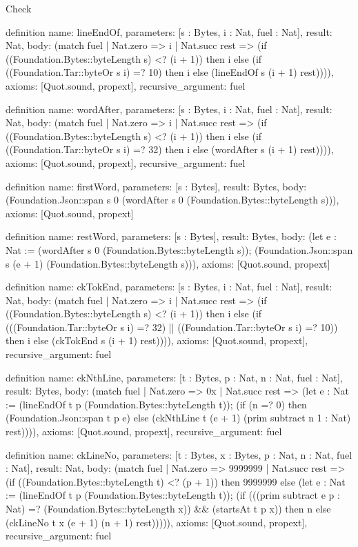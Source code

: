 \begin{lexlean}{Check}
\begin{semanticmodule}
definition{
  name: lineEndOf,
  parameters: [s : Bytes, i : Nat, fuel : Nat],
  result: Nat,
  body: (match fuel
    | Nat.zero => i
    | Nat.succ rest => (if ((Foundation.Bytes::byteLength s) <? (i + 1)) then i else (if ((Foundation.Tar::byteOr s i) =? 10) then i else (lineEndOf s (i + 1) rest)))),
  axioms: [Quot.sound, propext],
  recursive_argument: fuel
}

definition{
  name: wordAfter,
  parameters: [s : Bytes, i : Nat, fuel : Nat],
  result: Nat,
  body: (match fuel
    | Nat.zero => i
    | Nat.succ rest => (if ((Foundation.Bytes::byteLength s) <? (i + 1)) then i else (if ((Foundation.Tar::byteOr s i) =? 32) then i else (wordAfter s (i + 1) rest)))),
  axioms: [Quot.sound, propext],
  recursive_argument: fuel
}

definition{
  name: firstWord,
  parameters: [s : Bytes],
  result: Bytes,
  body: (Foundation.Json::span s 0 (wordAfter s 0 (Foundation.Bytes::byteLength s))),
  axioms: [Quot.sound, propext]
}

definition{
  name: restWord,
  parameters: [s : Bytes],
  result: Bytes,
  body: (let e : Nat := (wordAfter s 0 (Foundation.Bytes::byteLength s)); (Foundation.Json::span s (e + 1) (Foundation.Bytes::byteLength s))),
  axioms: [Quot.sound, propext]
}

definition{
  name: ckTokEnd,
  parameters: [s : Bytes, i : Nat, fuel : Nat],
  result: Nat,
  body: (match fuel
    | Nat.zero => i
    | Nat.succ rest => (if ((Foundation.Bytes::byteLength s) <? (i + 1)) then i else (if (((Foundation.Tar::byteOr s i) =? 32) || ((Foundation.Tar::byteOr s i) =? 10)) then i else (ckTokEnd s (i + 1) rest)))),
  axioms: [Quot.sound, propext],
  recursive_argument: fuel
}

definition{
  name: ckNthLine,
  parameters: [t : Bytes, p : Nat, n : Nat, fuel : Nat],
  result: Bytes,
  body: (match fuel
    | Nat.zero => 0x
    | Nat.succ rest => (let e : Nat := (lineEndOf t p (Foundation.Bytes::byteLength t)); (if (n =? 0) then (Foundation.Json::span t p e) else (ckNthLine t (e + 1) (prim subtract n 1 : Nat) rest)))),
  axioms: [Quot.sound, propext],
  recursive_argument: fuel
}

definition{
  name: ckLineNo,
  parameters: [t : Bytes, x : Bytes, p : Nat, n : Nat, fuel : Nat],
  result: Nat,
  body: (match fuel
    | Nat.zero => 9999999
    | Nat.succ rest => (if ((Foundation.Bytes::byteLength t) <? (p + 1)) then 9999999 else (let e : Nat := (lineEndOf t p (Foundation.Bytes::byteLength t)); (if (((prim subtract e p : Nat) =? (Foundation.Bytes::byteLength x)) && (startsAt t p x)) then n else (ckLineNo t x (e + 1) (n + 1) rest))))),
  axioms: [Quot.sound, propext],
  recursive_argument: fuel
}


\end{semanticmodule}
\end{lexlean}
